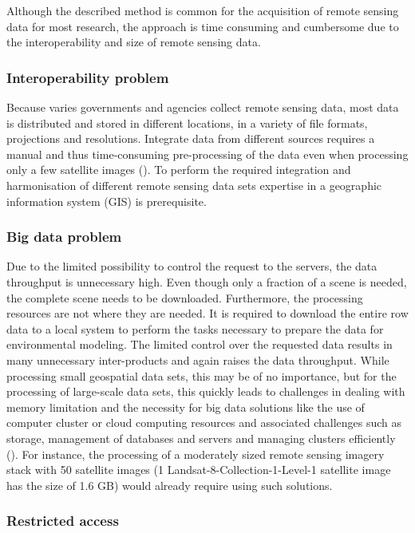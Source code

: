 Although the described method is common for the acquisition of remote sensing data for most research, the approach is time consuming and cumbersome due to the interoperability and size of remote sensing data.

\subsubsection{Interoperability problem}

Because varies governments and agencies collect remote sensing data, most data is distributed and stored in different locations, in a variety of file formats, projections and resolutions. Integrate data from different sources requires a manual and thus time-consuming pre-processing of the data even when processing only a few satellite images (\cite{schell2000geodata}). To perform the required integration and harmonisation of different remote sensing data sets expertise in a geographic information system (GIS) is prerequisite.

\subsubsection{Big data problem}

Due to the limited possibility to control the request to the servers, the data throughput is unnecessary high. Even though only a fraction of a scene is needed, the complete scene needs to be downloaded. Furthermore, the processing resources are not where they are needed. It is required to download the entire row data to a local system to perform the tasks necessary to prepare the data for environmental modeling. The limited control over the requested data results in many unnecessary inter-products and again raises the data throughput. While processing small geospatial data sets, this may be of no importance, but for the processing of large-scale data sets, this quickly leads to challenges in dealing with memory limitation and the necessity for big data solutions like the use of computer cluster or cloud computing resources and associated challenges such as storage, management of databases and servers and managing clusters efficiently (\cite{gorelick2017google}). 
For instance, the processing of a moderately sized remote sensing imagery stack with 50 satellite images (1 Landsat-8-Collection-1-Level-1 satellite image has the size of 1.6 GB) would already require using such solutions.

\subsubsection{Restricted access}

